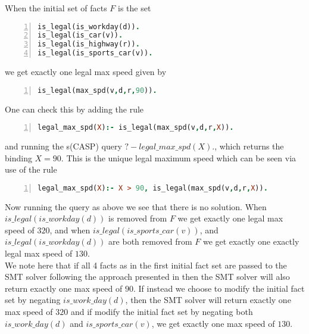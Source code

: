 When the initial set of facts $F$ is the set
\begin{lstlisting}[language=Prolog, numbers=left]
is_legal(is_workday(d)).
is_legal(is_car(v)).
is_legal(is_highway(r)).
is_legal(is_sports_car(v)).
\end{lstlisting}
we get exactly one legal max speed given by 
\begin{lstlisting}[language=Prolog, numbers=left]
is_legal(max_spd(v,d,r,90)).
\end{lstlisting}
One can check this by adding the rule 
\begin{lstlisting}[language=Prolog, numbers=left]
legal_max_spd(X):- is_legal(max_spd(v,d,r,X)). 
\end{lstlisting}
and running the s(CASP) query $?- legal\_max\_spd(X).$, which returns the binding $X = 90$. This is the unique legal maximum speed which can be seen via use of the rule 
\begin{lstlisting}[language=Prolog, numbers=left]
legal_max_spd(X):- X > 90, is_legal(max_spd(v,d,r,X)). 
\end{lstlisting}
Now running the query as above we see that there is no solution. 
When $is\_legal(is\_workday(d))$ is removed from $F$ we get exactly one legal max speed of $320$, and when  $is\_legal(is\_sports\_car(v))$, and $is\_legal(is\_workday(d))$ are both removed from $F$ we get exactly one exactly legal max speed of $130$.\\
We note here that if all 4 facts as in the first initial fact set are passed to the SMT solver following the approach presented in  then the SMT solver will also return exactly one max speed of $90$. If instead we choose to modify the initial fact set by negating $is\_work\_day(d)$, then the SMT solver will return exactly one max speed of $320$ and if modify the initial fact set by negating both  $is\_work\_day(d)$ and  $is\_sports\_car(v)$, we get exactly one max speed of $130$.







